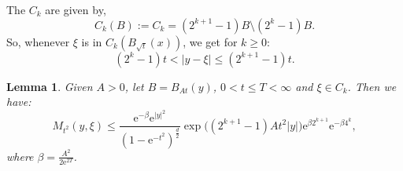 \documentclass[a4paper,oneside,10pt]{amsproc}
\newtheorem{lemma}{Lemma}
\theoremstyle{remark}
\renewcommand{\leq}{\leqslant}
\renewcommand{\leq}{\leqslant}
\renewcommand{\geq}{\geqslant}
\newcommand{\e}{\mathrm{e}} %
\renewcommand{\leq}{\leqslant}%
\renewcommand{\geq}{\geqslant}%
\begin{document}
The $C_k$ are given by,
\begin{equation}
  \label{eq:C_k-annulus-decomposition}
  C_k(B) := C_k = (2^{k + 1} - 1)B \setminus (2^k - 1)B.
\end{equation}
So, whenever $\xi$ is in $C_k(B_{\sqrt t}(x))$, we get for $k \geq 0$:
\begin{equation}
  \label{eq:C_k-annulus-decomposition-expand}
  (2^k - 1) t < |y - \xi| \leq (2^{k + 1} - 1) t.
\end{equation}

\begin{lemma}\label{lem:On-diagonal-kernel-estimates-on-Ck}
  Given $A > 0$, let $B = B_{At}(y)$, $0 < t \leq T < \infty$ and $\xi \in C_k$. Then we have:
  \begin{equation*}
    M_{t^2}(y, \xi) \leq \frac{\e^{-\beta} \e^{|y|^2}}{(1 - \e^{-t^2})^{\frac{d}2}}
    \exp\bigl((2^{k + 1} - 1) A t^2 |y| \bigr) \e^{\beta 2^{k + 1}} \e^{-\beta 4^k},
  \end{equation*}
  where $\beta = \frac{A^2}{2 \e^{2T}}$.
\end{lemma}
\end{document}
